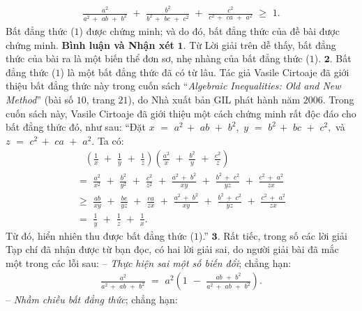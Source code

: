 \begin{multicols}{2}
\begin{align*}
		\frac{{{a^2}}}{{{a^2}\, + \,\,ab\,\, + \,\,{b^2}}}\,\, + \,\,\frac{{{b^2}}}{{{b^2}\, + \,\,bc\,\, + \,\,{c^2}}}\,\, + \,\,\frac{{{c^2}}}{{{c^2}\, + \,\,ca\,\, + \,\,{a^2}}}\,\, \ge \,\,1.
	\end{align*}
	Bất đẳng thức ($1$) được chứng minh; và do đó, bất đẳng thức của đề bài được chứng minh.
	\vskip 0.05cm
	\textbf{Bình luận và Nhận xét}
	\vskip 0.05cm
	$\pmb{1.}$ Từ Lời giải trên dễ thấy, bất đẳng thức của bài ra là một biến thể đơn sơ, nhẹ nhàng của bất đẳng thức ($1$).
	\vskip 0.05cm
	$\pmb{2.}$ Bất đẳng thức ($1$) là một bất đẳng thức đã có từ lâu. Tác giả Vasile Cirtoaje đã giới thiệu bất đẳng thức này trong cuốn sách “\textit{Algebraic Inequalities: Old and New Method}” (bài số $10$, trang $21$), do Nhà xuất bản GIL phát hành năm $2006$. Trong cuốn sách này, Vasile Cirtoaje đã giới thiệu một cách chứng minh rất độc đáo cho bất đẳng thức đó, như sau:
	\vskip 0.05cm
	“Đặt $x\,\, = \,\,{a^2}\, + \,\,ab\,\, + \,\,{b^2},$ $y\,\, = \,\,{b^2}\, + \,\,bc\,\, + \,\,{c^2},$      và $z\,\, = \,\,{c^2}\, + \,\,ca\,\, + \,\,{a^2}$.  Ta có:
	\begin{align*}
			\,\,\,\,\,\left( {\frac{1}{x}\,\, + \,\,\frac{1}{y}\,\, + \,\,\frac{1}{z}} \right)\left( {\frac{{{a^2}}}{x}\,\, + \,\,\frac{{{b^2}}}{y}\,\, + \,\,\frac{{{c^2}}}{z}} \right)\\
			= \,\,\frac{{{a^2}}}{{{x^2}}}\,\, + \,\,\frac{{{b^2}}}{{{y^2}}}\,\, + \,\,\frac{{{c^2}}}{{{z^2}}}\,\, + \,\,\frac{{{a^2}\, + \,\,{b^2}}}{{xy}}\,\, + \,\,\frac{{{b^2}\, + \,\,{c^2}}}{{yz}}\,\, + \,\,\frac{{{c^2}\, + \,\,{a^2}}}{{zx}}\\
			\ge \,\,\frac{{ab}}{{xy}}\,\, + \,\,\frac{{bc}}{{yz}}\,\, + \,\,\frac{{ca}}{{zx}}\,\, + \,\,\frac{{{a^2}\, + \,\,{b^2}}}{{xy}}\,\, + \,\,\frac{{{b^2}\, + \,\,{c^2}}}{{yz}}\,\, + \,\,\frac{{{c^2}\, + \,\,{a^2}}}{{zx}}\\
			= \,\,\frac{1}{y}\,\, + \,\,\frac{1}{z}\,\, + \,\,\frac{1}{x}.
	\end{align*}
	Từ đó, hiển nhiên thu được bất đẳng thức ($1$).”
	\vskip 0.05cm
	$\pmb{3.}$ Rất tiếc, trong số các lời giải Tạp chí đã nhận được từ bạn đọc, có hai lời giải sai, do người giải bài đã mắc một trong các lỗi sau:
	\vskip 0.05cm
	-- \textit{Thực hiện sai một số biến đổi}; chẳng hạn:
	\begin{align*}
		\frac{{{a^2}}}{{{a^2}\, + \,\,ab\,\, + \,\,{b^2}}}\,\, = \,\,{a^2}\left( {1\,\, - \,\,\frac{{ab\,\, + \,\,{b^2}}}{{{a^2}\, + \,\,ab\,\, + \,\,{b^2}}}} \right).
	\end{align*}
	-- \textit{Nhầm chiều bất đẳng thức}; chẳng hạn:

\end{multicols}
